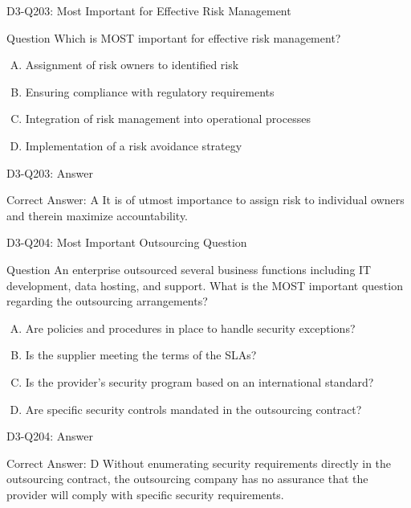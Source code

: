 \documentclass{beamer}
\begin{document}
	\begin{frame}{D3-Q203: Most Important for Effective Risk Management}
		\begin{block}{Question}
			Which is MOST important for effective risk management?
		\end{block}
		\begin{enumerate}[(A)]
			\item Assignment of risk owners to identified risk
			\item Ensuring compliance with regulatory requirements
			\item Integration of risk management into operational processes
			\item Implementation of a risk avoidance strategy
		\end{enumerate}
	\end{frame}
	\begin{frame}{D3-Q203: Answer}
		\begin{block}{Correct Answer: A}
			It is of utmost importance to assign risk to individual owners and therein maximize accountability.
		\end{block}
	\end{frame}
	
	\begin{frame}{D3-Q204: Most Important Outsourcing Question}
		\begin{block}{Question}
			An enterprise outsourced several business functions including IT development, data hosting, and support. What is the MOST important question regarding the outsourcing arrangements?
		\end{block}
		\begin{enumerate}[(A)]
			\item Are policies and procedures in place to handle security exceptions?
			\item Is the supplier meeting the terms of the SLAs?
			\item Is the provider's security program based on an international standard?
			\item Are specific security controls mandated in the outsourcing contract?
		\end{enumerate}
	\end{frame}
	\begin{frame}{D3-Q204: Answer}
		\begin{block}{Correct Answer: D}
			Without enumerating security requirements directly in the outsourcing contract, the outsourcing company has no assurance that the provider will comply with specific security requirements.
		\end{block}
	\end{frame}
	
\end{document}
